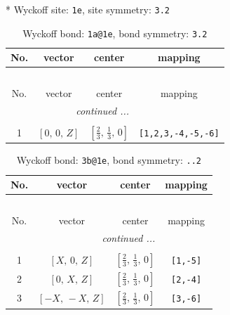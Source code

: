 \documentclass[fleqn,8pt]{jsarticle}
\begin{document}
* Wyckoff site: {\tt 1e}, site symmetry: {\tt 3.2}
\renewcommand{\arraystretch}{1.2}
\begin{longtable}{cccc}
\caption{Wyckoff bond: {\tt 1a@1e}, bond symmetry: {\tt 3.2}}
 \\
 \hline \hline
No. & vector & center & mapping \\ \hline \endfirsthead

\multicolumn{3}{l}{\tablename\ \thetable{}} \\
 \hline \hline
No. & vector & center & mapping \\ \hline \endhead

 \hline \hline
\multicolumn{3}{r}{\footnotesize\it continued ...} \\ \endfoot

 \hline \hline
\multicolumn{3}{r}{} \\ \endlastfoot

1 & $\left[ 0,\, 0,\, Z \right]$ & $\left[ \frac{2}{3},\, \frac{1}{3},\, 0 \right]$ & {\tt [1,2,3,-4,-5,-6]} \\
\end{longtable}
\renewcommand{\arraystretch}{1.2}
\begin{longtable}{cccc}
\caption{Wyckoff bond: {\tt 3b@1e}, bond symmetry: {\tt ..2}}
 \\
 \hline \hline
No. & vector & center & mapping \\ \hline \endfirsthead

\multicolumn{3}{l}{\tablename\ \thetable{}} \\
 \hline \hline
No. & vector & center & mapping \\ \hline \endhead

 \hline \hline
\multicolumn{3}{r}{\footnotesize\it continued ...} \\ \endfoot

 \hline \hline
\multicolumn{3}{r}{} \\ \endlastfoot

1 & $\left[ X,\, 0,\, Z \right]$ & $\left[ \frac{2}{3},\, \frac{1}{3},\, 0 \right]$ & {\tt [1,-5]} \\ \hline
2 & $\left[ 0,\, X,\, Z \right]$ & $\left[ \frac{2}{3},\, \frac{1}{3},\, 0 \right]$ & {\tt [2,-4]} \\ \hline
3 & $\left[ - X,\, - X,\, Z \right]$ & $\left[ \frac{2}{3},\, \frac{1}{3},\, 0 \right]$ & {\tt [3,-6]} \\
\end{longtable}
\renewcommand{\arraystretch}{1.2}
\end{document}
